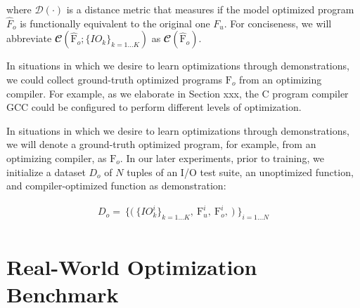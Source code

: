 \documentclass{article}
\begin{document}
where $\mathcal{D}(\cdot)$ is a distance metric that measures if the model optimized program $\hat{F}_o$ is functionally equivalent to the original one $F_u$. For conciseness, we will abbreviate $\mathbfcal{C} (\hat{\textrm{F}}_{o}; \{IO_k\}_{k=1...K})$  as $\mathbfcal{C} (\hat{\textrm{F}}_{o})$. 

In situations in which we desire to learn optimizations through demonstrations, we could collect ground-truth optimized programs $\textrm{F}_o$ from an optimizing compiler.
For example, as we elaborate in Section xxx, the C program compiler GCC could be configured to perform different levels of optimization.

In situations in which we desire to learn optimizations through demonstrations, we will denote a ground-truth optimized program, for example, from an optimizing compiler, as $\textrm{F}_o$. In our later experiments, prior to training, we initialize a dataset $D_o$ of $N$ tuples of an I/O test suite, an unoptimized function, and compiler-optimized function as demonstration: 

\begin{equation} 
    \begin{split}
    \label{eqn:init_dataset}
        D_o = \
                \bigg\{
                    \Big( \
                        \{IO_k^i\}_{k=1...K}, \
                        \textrm{F}_{u}^i, \
                        \textrm{F}_{o}^i, \
                    \Big) \
                \bigg\}_{i = 1...N} \\
    \end{split}
\end{equation}



\section{Real-World Optimization Benchmark}

\end{document}
